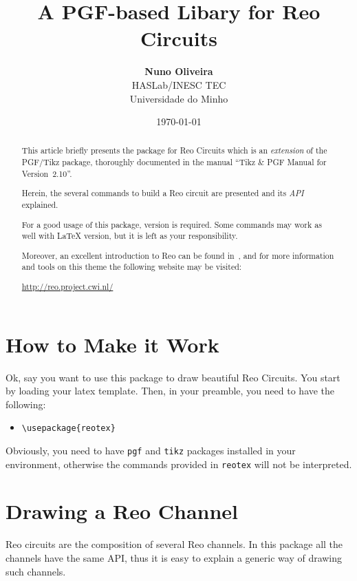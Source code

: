 \documentclass[11pt]{article}
\title{A PGF-based Libary for Reo Circuits}
\author{\textbf{Nuno Oliveira}\\[12pt]HASLab/INESC TEC\\Universidade do Minho}
\date{\today}
\begin{document}
\maketitle


\begin{abstract}
This article briefly presents the package for Reo Circuits which is an \emph{extension} of the PGF/Tikz package, thoroughly documented in the manual ``Tikz \& PGF Manual for Version~2.10''.

Herein, the several commands to build a Reo circuit are presented and its \emph{API} explained.  

For a good usage of this package, \LaTeXe{} version is required. Some commands may work as well with \LaTeX{} version, but it is left as your responsibility.

Moreover, an excellent introduction to Reo can be found in~\cite{arbab04}, and for more information and tools on this theme the following website may be visited:
\begin{center}
\url{http://reo.project.cwi.nl/}
\end{center}

\end{abstract}


\section{How to Make it Work}

Ok, say you want to use this package to draw beautiful Reo Circuits. 
You start by loading your latex template. 
Then, in your preamble, you need to have the following:

\begin{itemize}
\item \verb+\usepackage{reotex}+
\end{itemize} 

Obviously, you need to have \verb+pgf+ and \verb+tikz+ packages installed in your environment, otherwise the commands provided in \verb+reotex+ will not be interpreted.


\section{Drawing a Reo Channel}

Reo circuits are the composition of several Reo channels. 
In this package all the channels have the same API, thus it is 
easy to explain a generic way of drawing such channels.
\end{document}
